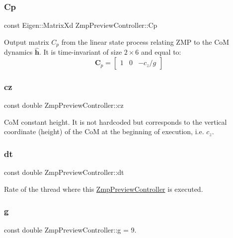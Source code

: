 \subsubsection{\texorpdfstring{Cp}{Cp}}
{\footnotesize\ttfamily const Eigen\+::\+Matrix\+Xd Zmp\+Preview\+Controller\+::\+Cp\hspace{0.3cm}{\ttfamily [private]}}

Output matrix $C_p$ from the linear state process relating Z\+MP to the CoM dynamics $\hat{\mathbf{h}}$. It is time-\/invariant of size $2\times6$ and equal to\+: \[ \mathbf{C}_p = \left[\begin{array}{ccc} 1 & 0 & -c_z/g \end{array}\right] \] \hypertarget{classZmpPreviewController_a3a317d26cc1bbaf8811491724fdd1def}{}\label{classZmpPreviewController_a3a317d26cc1bbaf8811491724fdd1def} 
\subsubsection{\texorpdfstring{cz}{cz}}
{\footnotesize\ttfamily const double Zmp\+Preview\+Controller\+::cz\hspace{0.3cm}{\ttfamily [private]}}

CoM constant height. It is not hardcoded but corresponds to the vertical coordinate (height) of the CoM at the beginning of execution, i.\+e. $ c_z $. \hypertarget{classZmpPreviewController_abf1a3ec8d1698afab1c20bba32b5a724}{}\label{classZmpPreviewController_abf1a3ec8d1698afab1c20bba32b5a724} 
\subsubsection{\texorpdfstring{dt}{dt}}
{\footnotesize\ttfamily const double Zmp\+Preview\+Controller\+::dt\hspace{0.3cm}{\ttfamily [private]}}

Rate of the thread where this \hyperlink{classZmpPreviewController}{Zmp\+Preview\+Controller} is executed. \hypertarget{classZmpPreviewController_a344571f012aa58250d7625905681bf1b}{}\label{classZmpPreviewController_a344571f012aa58250d7625905681bf1b} 
\subsubsection{\texorpdfstring{g}{g}}
{\footnotesize\ttfamily const double Zmp\+Preview\+Controller\+::g = 9.\hspace{0.3cm}{\ttfamily [private]}}

